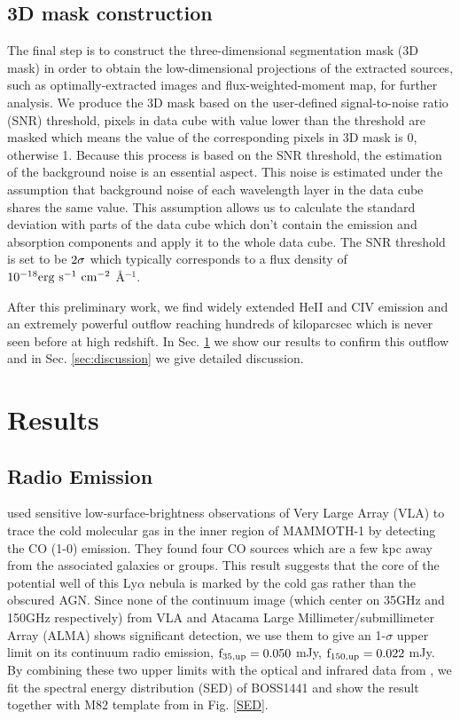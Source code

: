  \subsection{3D mask construction}
 The final step is to construct the three-dimensional segmentation mask (3D mask) in order to obtain the low-dimensional projections of the extracted sources, such as optimally-extracted images and flux-weighted-moment map, for further analysis. We produce the 3D mask based on the user-defined signal-to-noise ratio (SNR) threshold, pixels in data cube with value lower than the threshold are masked which means the value of the corresponding pixels in 3D mask is 0, otherwise 1.  Because this process is based on the SNR threshold, the estimation of the background noise is an essential aspect. This noise is estimated under the assumption that background noise of each wavelength layer in the data cube shares the same value. This assumption allows us to calculate the standard deviation with parts of the data cube which don't contain the emission and absorption components and apply it to the whole data cube. The SNR threshold is set to be $\rm 2\sigma$ which typically corresponds to a flux density of $\rm 10^{-18} erg \ s^{-1} \ cm^{-2}$ \AA$^{-1}$.
 
 After this preliminary work, we find widely extended HeII and CIV emission and an extremely powerful outflow reaching hundreds of kiloparcsec which is never seen before at high redshift. In Sec. \ref{sec:results} we show our results to confirm this outflow and in Sec. \ref{sec:discussion} we give detailed discussion.


\section{Results}
\label{sec:results}
\subsection{Radio Emission}

\cite{emonts2019cold} used sensitive low-surface-brightness observations of Very Large Array (VLA) to trace the cold molecular gas in the inner region of MAMMOTH-1 by detecting the CO (1-0) emission. They found four CO sources which are a few kpc away from the associated galaxies or groups. This result suggests that the core of the potential well of this Ly$\alpha$ nebula is marked by the cold gas rather than the obscured AGN. Since none of the continuum image (which center on 35GHz and 150GHz respectively) from VLA and Atacama Large Millimeter/submillimeter Array (ALMA) shows significant detection, we use them to give an 1-$\sigma$ upper limit on its continuum radio emission, $\rm f_{35,up}=0.050$ mJy, $\rm f_{150,up}=0.022$ mJy. By combining these two upper limits with the optical and infrared data from \citet{arrigoni2018overdensity}, we fit the spectral energy distribution (SED) of BOSS1441 and show the result together with M82 template from \cite{Silva_1998} in Fig. \ref{SED}. 
	
